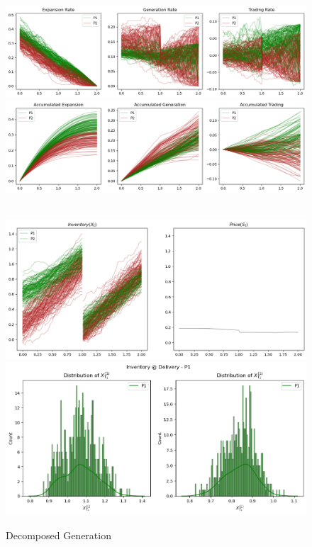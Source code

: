 \documentclass{article}
\begin{document}
{\begin{figure}[ht]
    \centering
    \includegraphics{FinalReports/Illustration_Diagrams/Joint-2A2P-Sigmoid-ResExamples/Rates.png}\\
    \includegraphics{FinalReports/Illustration_Diagrams/Joint-2A2P-Sigmoid-ResExamples/AccumRates.png}
    \caption{Decomposed Generation}\label{fig:enter-label}\\
    \vspace{2\baselineskip}
    \includegraphics{FinalReports/Illustration_Diagrams/Joint-2A2P-Sigmoid-ResExamples/InvAndPrice.png}\\
    \includegraphics{FinalReports/Illustration_Diagrams/Joint-2A2P-Sigmoid-ResExamples/InvPreDeli_P1.png}\\

\end{figure}}
\end{document}
